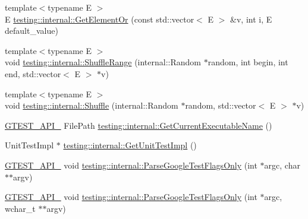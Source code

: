\begin{DoxyCompactItemize}
\item 
{\footnotesize template$<$typename E $>$ }\\E \hyperlink{namespacetesting_1_1internal_a71fdd20a0686bea3dc0cdcd95e0bca1c}{testing\-::internal\-::\-Get\-Element\-Or} (const std\-::vector$<$ E $>$ \&v, int i, E default\-\_\-value)
\item 
{\footnotesize template$<$typename E $>$ }\\void \hyperlink{namespacetesting_1_1internal_a0e1d3dc36138a591769412d4c7779861}{testing\-::internal\-::\-Shuffle\-Range} (internal\-::\-Random $\ast$random, int begin, int end, std\-::vector$<$ E $>$ $\ast$v)
\item 
{\footnotesize template$<$typename E $>$ }\\void \hyperlink{namespacetesting_1_1internal_a90d9e6ffe8522a7eb1b2ce9b1a0c4673}{testing\-::internal\-::\-Shuffle} (internal\-::\-Random $\ast$random, std\-::vector$<$ E $>$ $\ast$v)
\item 
\hyperlink{gtest-port_8h_aa73be6f0ba4a7456180a94904ce17790}{G\-T\-E\-S\-T\-\_\-\-A\-P\-I\-\_\-} File\-Path \hyperlink{namespacetesting_1_1internal_a7a2bbf069f75bc99873976ad6fc356ad}{testing\-::internal\-::\-Get\-Current\-Executable\-Name} ()
\item 
Unit\-Test\-Impl $\ast$ \hyperlink{namespacetesting_1_1internal_a9bd0caf5d16512de38b39599c13ee634}{testing\-::internal\-::\-Get\-Unit\-Test\-Impl} ()
\item 
\hyperlink{gtest-port_8h_aa73be6f0ba4a7456180a94904ce17790}{G\-T\-E\-S\-T\-\_\-\-A\-P\-I\-\_\-} void \hyperlink{namespacetesting_1_1internal_a472880afbcc592a41e3d623e2dec8412}{testing\-::internal\-::\-Parse\-Google\-Test\-Flags\-Only} (int $\ast$argc, char $\ast$$\ast$argv)
\item 
\hyperlink{gtest-port_8h_aa73be6f0ba4a7456180a94904ce17790}{G\-T\-E\-S\-T\-\_\-\-A\-P\-I\-\_\-} void \hyperlink{namespacetesting_1_1internal_aa3c81a67914856448d0778990d9d9cab}{testing\-::internal\-::\-Parse\-Google\-Test\-Flags\-Only} (int $\ast$argc, wchar\-\_\-t $\ast$$\ast$argv)
\end{DoxyCompactItemize}
